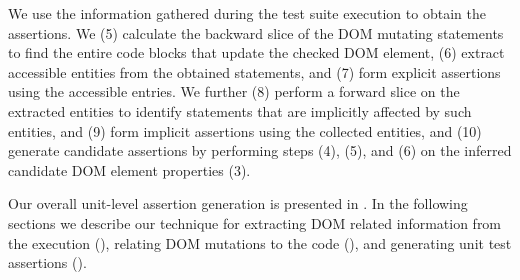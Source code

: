 We use the information gathered during the test suite execution to obtain the assertions. We (5) calculate the backward slice of the DOM mutating statements to find the entire code blocks that update the checked DOM element, (6) extract accessible entities from the obtained statements, and (7) form explicit assertions using the accessible entries. 
We further (8) perform a forward slice on the extracted entities to identify statements that are implicitly affected by such entities, and (9) form implicit assertions using the collected entities, and (10) generate candidate assertions by performing steps (4), (5), and (6) on the inferred candidate DOM element properties (3).

Our overall unit-level assertion generation is presented in . In the following sections we describe our technique for extracting DOM related information from the execution (), relating
DOM mutations to the \javascript code (), and generating unit test assertions ().   


         
